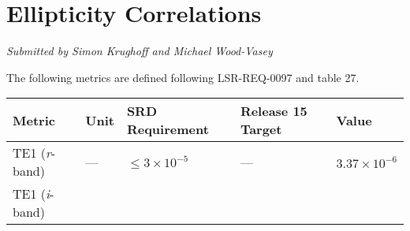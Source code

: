 \documentclass[DM,toc]{lsstdoc}
\begin{document}
\section{Ellipticity Correlations}\label{ellipticity-correlations}

\emph{Submitted by Simon Krughoff and Michael Wood-Vasey}

The following metrics are defined following LSR-REQ-0097
 and  table 27.

\begin{longtable}[]{@{}lllll@{}}
\toprule
\begin{minipage}[b]{0.13\columnwidth}\raggedright\strut
Metric\strut
\end{minipage} & \begin{minipage}[b]{0.05\columnwidth}\raggedright\strut
Unit\strut
\end{minipage} & \begin{minipage}[b]{0.24\columnwidth}\raggedright\strut
SRD Requirement\strut
\end{minipage} & \begin{minipage}[b]{0.21\columnwidth}\raggedright\strut
Release 15 Target\strut
\end{minipage} & \begin{minipage}[b]{0.22\columnwidth}\raggedright\strut
Value\strut
\end{minipage}\tabularnewline
\midrule
\endhead
\begin{minipage}[t]{0.13\columnwidth}\raggedright\strut
TE1 (\emph{r}-band)\strut
\end{minipage} & \begin{minipage}[t]{0.05\columnwidth}\raggedright\strut
---\strut
\end{minipage} & \begin{minipage}[t]{0.24\columnwidth}\raggedright\strut
\(\leq 3\times 10^{-5}\)\strut
\end{minipage} & \begin{minipage}[t]{0.21\columnwidth}\raggedright\strut
---\strut
\end{minipage} & \begin{minipage}[t]{0.22\columnwidth}\raggedright\strut
\(3.37\times 10^{-6}\)\strut
\end{minipage}\tabularnewline
\begin{minipage}[t]{0.13\columnwidth}\raggedright\strut
TE1 (\emph{i}-band)\strut
\end{minipage} & \begin{minipage}[t]{0.05\columnwidth}\raggedright\strut

\end{minipage}
\end{longtable}
\end{document}
